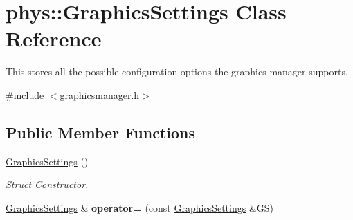 \hypertarget{structphys_1_1GraphicsSettings}{
\section{phys::GraphicsSettings Class Reference}
\label{d0/dd0/structphys_1_1GraphicsSettings}
}


This stores all the possible configuration options the graphics manager supports.  




{\ttfamily \#include $<$graphicsmanager.h$>$}

\subsection*{Public Member Functions}
\begin{DoxyCompactItemize}
\item 
\hypertarget{structphys_1_1GraphicsSettings_aceaaf53585413067adbf271e2c1e48fa}{
\hyperlink{structphys_1_1GraphicsSettings_aceaaf53585413067adbf271e2c1e48fa}{GraphicsSettings} ()}
\label{d0/dd0/structphys_1_1GraphicsSettings_aceaaf53585413067adbf271e2c1e48fa}

\begin{DoxyCompactList}\small\item\em Struct Constructor. \item\end{DoxyCompactList}\item 
\hypertarget{structphys_1_1GraphicsSettings_a9f9ae60c530d078307cf3ee9f39821fe}{
\hyperlink{structphys_1_1GraphicsSettings}{GraphicsSettings} \& {\bfseries operator=} (const \hyperlink{structphys_1_1GraphicsSettings}{GraphicsSettings} \&GS)}
\label{d0/dd0/structphys_1_1GraphicsSettings_a9f9ae60c530d078307cf3ee9f39821fe}

\end{DoxyCompactItemize}
